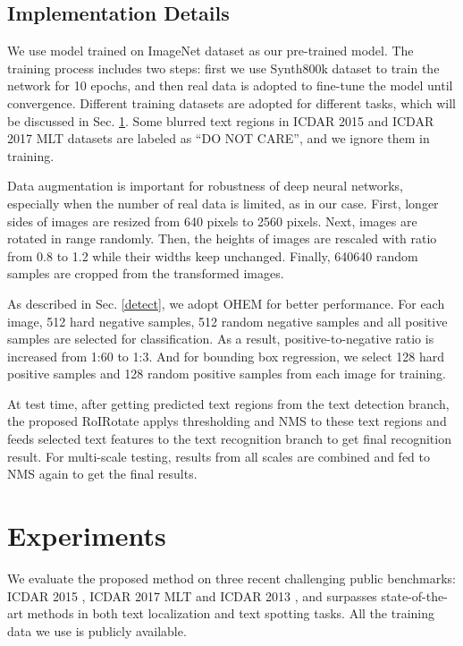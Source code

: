 \documentclass[10pt,twocolumn,letterpaper]{article}
\begin{document}
\subsection{Implementation Details}
\label{train}
We use model trained on ImageNet dataset \cite{krizhevsky2012imagenet} as our pre-trained model. The training process includes two steps: first we use Synth800k dataset \cite{gupta2016synthetic} to train the network for 10 epochs, and then real data is adopted to fine-tune the model until convergence. Different training datasets are adopted for different tasks, which will be discussed in Sec. \ref{exper}. Some blurred text regions in ICDAR 2015 and ICDAR 2017 MLT datasets are labeled as ``DO NOT CARE'', and we ignore them in training.

Data augmentation is important for robustness of deep neural networks, especially when the number of real data is limited, as in our case. First, longer sides of images are resized from 640 pixels to 2560 pixels. Next, images are rotated in range  randomly. Then, the heights of images are rescaled with ratio from 0.8 to 1.2 while their widths keep unchanged. Finally, 640640 random samples are cropped from the transformed images.

As described in Sec. \ref{detect}, we adopt OHEM for better performance. For each image, 512 hard negative samples, 512 random negative samples and all positive samples are selected for classification. As a result, positive-to-negative ratio is increased from 1:60 to 1:3. And for bounding box regression, we select 128 hard positive samples and 128 random positive samples from each image for training.

At test time, after getting predicted text regions from the text detection branch, the proposed RoIRotate applys thresholding and NMS to these text regions and feeds selected text features to the text recognition branch to get final recognition result. For multi-scale testing, results from all scales are combined and fed to NMS again to get the final results.
\section{Experiments}
\label{exper}

We evaluate the proposed method on three recent challenging public benchmarks: ICDAR 2015 \cite{karatzas2015icdar15}, ICDAR 2017 MLT \cite{icdar17} and ICDAR 2013 \cite{karatzas2013icdar}, and surpasses state-of-the-art methods in both text localization and text spotting tasks. All the training data we use is publicly available.
\end{document}

